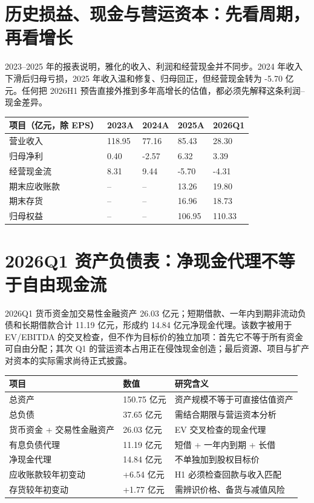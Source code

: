 \section{历史损益、现金与营运资本：先看周期，再看增长}

2023--2025 年的报表说明，雅化的收入、利润和经营现金并不同步。2024 年收入下滑后归母亏损，2025 年收入温和修复、归母回正，但经营现金转为 -5.70 亿元。任何把 2026H1 预告直接外推到多年高增长的估值，都必须先解释这条利润--现金差异。

\begin{exhibitbox}[表 A-2：历史财务摘要]
\begin{tabularx}{\exhibitboxwidth}{L{3.3cm}R{2.1cm}R{2.1cm}R{2.1cm}R{2.1cm}}
\toprule
项目（亿元，除 EPS） & 2023A & 2024A & 2025A & 2026Q1 \\
\midrule
营业收入 & 118.95 & 77.16 & 85.43 & 28.30 \\
归母净利 & 0.40 & -2.57 & 6.32 & 3.39 \\
经营现金流 & 8.31 & 9.44 & -5.70 & -4.31 \\
期末应收账款 & -- & -- & 13.26 & 19.80 \\
期末存货 & -- & -- & 16.96 & 18.73 \\
归母权益 & -- & -- & 106.95 & 110.33 \\
\bottomrule
\end{tabularx}
\end{exhibitbox}

\section{2026Q1 资产负债表：净现金代理不等于自由现金流}

2026Q1 货币资金加交易性金融资产 26.03 亿元；短期借款、一年内到期非流动负债和长期借款合计 11.19 亿元，形成约 14.84 亿元净现金代理。该数字被用于 EV/EBITDA 的交叉检查，但不作为目标价的独立加项：首先它不等于所有资金可自由分配；其次 Q1 的营运资本占用正在侵蚀现金创造；最后资源、项目与扩产对资本的实际需求尚待正式披露。

\begin{exhibitbox}[表 A-3：2026Q1 资本与营运资本观察]
\begin{tabularx}{\exhibitboxwidth}{L{4.2cm}R{2.4cm}X}
\toprule
项目 & 数值 & 研究含义 \\
\midrule
总资产 & 150.75 亿元 & 资产规模不等于可直接估值资产 \\
总负债 & 37.65 亿元 & 需结合期限与营运资本分析 \\
货币资金 + 交易性金融资产 & 26.03 亿元 & EV 交叉检查的现金代理 \\
有息负债代理 & 11.19 亿元 & 短借 + 一年内到期 + 长借 \\
净现金代理 & 14.84 亿元 & 不单独加到股权目标价 \\
应收账款较年初变动 & +6.54 亿元 & H1 必须检查回款与收入匹配 \\
存货较年初变动 & +1.77 亿元 & 需辨识价格、备货与减值风险 \\
\bottomrule
\end{tabularx}
\end{exhibitbox}

